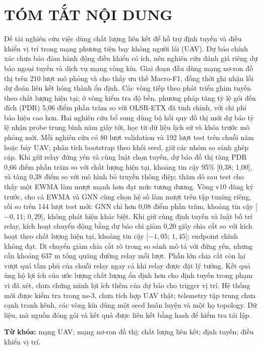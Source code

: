 \documentclass[12pt,a4paper]{report}
\begin{document}
\chapter*{TÓM TẮT NỘI DUNG}
Đề tài nghiên cứu việc dùng chất lượng liên kết để hỗ trợ định tuyến và điều khiển vị trí trong mạng phương tiện bay không người lái (UAV). Dự báo chính xác chưa bảo đảm hành động điều khiển có ích, nên nghiên cứu đánh giá riêng dự báo ngoại tuyến và dịch vụ mạng vòng kín. Giai đoạn đầu dùng mạng nơ-ron đồ thị trên 210 lượt mô phỏng và cho thấy ưu thế Macro-F1, đồng thời ghi nhận lỗi dự đoán liên kết hỏng thành ổn định. Các vòng tiếp theo phát triển ghim tuyến theo chất lượng hiện tại; ở vòng kiểm tra độ bền, phương pháp tăng tỷ lệ gói đến đích (PDR) 5,06 điểm phần trăm so với OLSR-ETX đã tinh chỉnh, với chi phí báo hiệu cao hơn. Hai nghiên cứu bổ sung dùng bộ hồi quy đồ thị mới dự báo tỷ lệ nhận probe trung bình năm giây tới, học từ dữ liệu lịch sử và khóa trước mô phỏng mới. Mỗi nghiên cứu có 80 lượt validation và 192 lượt test trên chuỗi năm hoặc bảy UAV; phân tích bootstrap theo khối seed, giữ các nhóm so sánh ghép cặp. Khi giữ relay đứng yên và cùng luật chọn tuyến, dự báo đồ thị tăng PDR 0,66 điểm phần trăm so với chất lượng hiện tại, khoảng tin cậy 95\% [0,38; 1,00], và tăng 0,38 điểm so với mô hình bỏ truyền thông điệp; thăm dò sau test cho thấy một EWMA làm mượt mạnh hơn đạt mức tương đương. Vòng v10 đăng ký trước, cho cả EWMA và GNN cùng chọn hệ số làm mượt trên tập tuning riêng, rồi so trên 144 lượt test mới: GNN chỉ hơn 0,08 điểm phần trăm, khoảng tin cậy [$-0{,}11$; $0{,}29$], không phát hiện khác biệt. Khi giữ cùng định tuyến và luật bố trí relay, kích hoạt chuyển động bằng dự báo chỉ giảm 0,20 giây chia cắt so với kích hoạt theo chất lượng hiện tại, khoảng tin cậy [$-1,05$; $1,45$]; endpoint chính không đạt. Di chuyển giảm chia cắt rõ trong so sánh mô tả với đứng yên, nhưng cần khoảng 637 m tổng quãng đường relay mỗi lượt. Phần lớn chia cắt còn lại vượt quá tầm phủ của chuỗi relay ngay cả khi relay được đặt lý tưởng. Kết quả ủng hộ lợi ích của ước lượng chất lượng ổn định hơn cho định tuyến trong phạm vi đã xét, chưa chứng minh lợi ích thêm của dự báo cho trigger vị trí. Hệ thống mới được kiểm tra trong ns-3, chưa tích hợp UAV thật; telemetry tập trung chưa cạnh tranh kênh, các vòng kín dùng một seed huấn luyện và một họ topology. Dữ liệu, mã nguồn đóng gói và kết quả được liên kết bằng hash để kiểm tra tái lập.

\noindent\textbf{Từ khóa:} mạng UAV; mạng nơ-ron đồ thị; chất lượng liên kết; định tuyến; điều khiển vị trí.
\clearpage
\tableofcontents
\clearpage
{}\listoffigures
\clearpage
{}\listoftables
\clearpage
\end{document}
